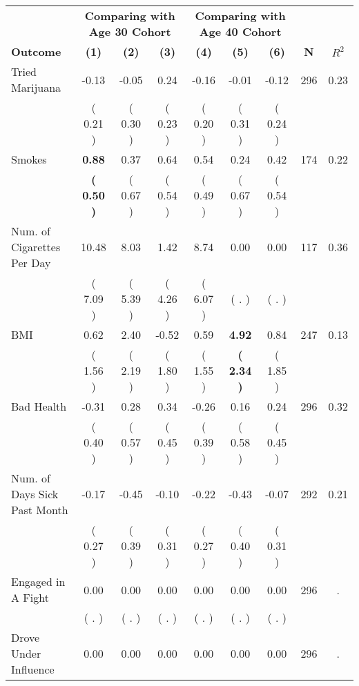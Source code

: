 \begin{tabular}{lcccccccc}
\toprule
 & \multicolumn{3}{c}{\textbf{Comparing with Age 30 Cohort}} & \multicolumn{3}{c}{\textbf{Comparing with Age 40 Cohort}} & \\
\cmidrule(lr){2-4} \cmidrule(lr){5-7} 
 \textbf{Outcome} & \textbf{(1)} & \textbf{(2)} & \textbf{(3)} & \textbf{(4)} & \textbf{(5)} & \textbf{(6)} & \textbf{N} & \textbf{$ R^2$} \\
\midrule
Tried Marijuana &     -0.13 &     -0.05 &      0.24 &     -0.16 &     -0.01 &     -0.12 & 296 &       0.23 \\ 
 & (     0.21 ) & (     0.30 ) & (     0.23 ) & (     0.20 ) & (     0.31 ) & (     0.24 ) & \\
Smokes & \textbf{     0.88} &      0.37 &      0.64 &      0.54 &      0.24 &      0.42 & 174 &       0.22 \\ 
 & \textbf{(     0.50 )} & (     0.67 ) & (     0.54 ) & (     0.49 ) & (     0.67 ) & (     0.54 ) & \\
Num. of Cigarettes Per Day &     10.48 &      8.03 &      1.42 &      8.74 &      0.00 &      0.00 & 117 &       0.36 \\ 
 & (     7.09 ) & (     5.39 ) & (     4.26 ) & (     6.07 ) & (        . ) & (        . ) & \\
BMI &      0.62 &      2.40 &     -0.52 &      0.59 & \textbf{     4.92} &      0.84 & 247 &       0.13 \\ 
 & (     1.56 ) & (     2.19 ) & (     1.80 ) & (     1.55 ) & \textbf{(     2.34 )} & (     1.85 ) & \\
Bad Health &     -0.31 &      0.28 &      0.34 &     -0.26 &      0.16 &      0.24 & 296 &       0.32 \\ 
 & (     0.40 ) & (     0.57 ) & (     0.45 ) & (     0.39 ) & (     0.58 ) & (     0.45 ) & \\
Num. of Days Sick Past Month &     -0.17 &     -0.45 &     -0.10 &     -0.22 &     -0.43 &     -0.07 & 292 &       0.21 \\ 
 & (     0.27 ) & (     0.39 ) & (     0.31 ) & (     0.27 ) & (     0.40 ) & (     0.31 ) & \\
Engaged in A Fight &      0.00 &      0.00 &      0.00 &      0.00 &      0.00 &      0.00 & 296 &          . \\ 
 & (        . ) & (        . ) & (        . ) & (        . ) & (        . ) & (        . ) & \\
Drove Under Influence &      0.00 &      0.00 &      0.00 &      0.00 &      0.00 &      0.00 & 296 &          . \\ 

\end{tabular}
